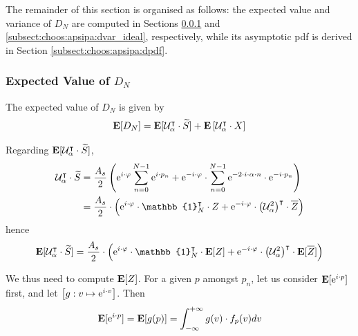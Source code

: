 The remainder of this section is organised as follows: the expected value and variance of $D_N$ are computed in Sections \ref{subsect:choos:apsipa:espd} and \ref{subsect:choos:apsipa:dvar_ideal}, respectively, while its asymptotic \gls{pdf} is derived in Section \ref{subsect:choos:apsipa:dpdf}.

\subsubsection{Expected Value of \texorpdfstring{$D_N$}{DN}}\label{subsect:choos:apsipa:espd}

The expected value of $D_N$ is given by
\begin{equation}
	\mathbf{E}[D_N] = \mathbf{E}[\mathcal{U}_\alpha^\intercal\cdot \widetilde{S} ] + \mathbf{E}\left[\mathcal{U}_\alpha^\intercal\cdot X\right]
\end{equation}

Regarding $\mathbf{E}[\mathcal{U}_\alpha^\intercal\cdot \widetilde{S} ]$,
\begin{equation}
	\begin{aligned}
		\mathcal{U}_\alpha^\intercal\cdot \widetilde{S} &= \frac{A_s}{2}\left(\e^{i\cdot \varphi} \sum_{n=0}^{N-1} \e^{i \cdot p_n} + \e^{-i\cdot \varphi} \cdot \sum_{n=0}^{N-1} \e^{-2\cdot i\cdot \alpha \cdot n} \cdot \e^{-i \cdot p_n}\right)\\
		&= \frac{A_s}{2} \cdot \left(\e^{i \cdot \varphi} \cdot \mathbb{1}_N^\intercal\cdot Z + \e^{-i\cdot \varphi} \cdot \left(\mathcal{U}_{\alpha}^2\right)^\intercal \cdot \conj{Z}\right)
	\end{aligned}
\end{equation}
hence
\begin{equation}
	\esp[\mathcal{U}_\alpha^\intercal\cdot \widetilde{S}] = \frac{A_s}{2} \cdot \left(\e^{i \cdot \varphi} \cdot \mathbb{1}_N^\intercal\cdot \esp[Z] \vphantom{\e^{-i\cdot \varphi} \cdot \left(\mathcal{U}_{\alpha}^2\right)^\intercal \cdot \esp[\conj{Z}]}
	+ \e^{-i\cdot \varphi} \cdot \left(\mathcal{U}_{\alpha}^2\right)^\intercal \cdot \esp[\conj{Z}]\right)
\end{equation}

We thus need to compute $\mathbf{E}[Z]$. For a given $p$ amongst $p_n$, let us consider $\mathbf{E}[\mathrm{e}^{i\cdot p}]$ first, and let $\left[g: v \mapsto \mathrm{e}^{i\cdot v}\right]$. Then
\begin{equation}
	\mathbf{E}[\mathrm{e}^{i\cdot p}] = \mathbf{E}[g(p)] =  \int_{-\infty}^{+\infty} g(v) \cdot f_p(v) dv
\end{equation}

